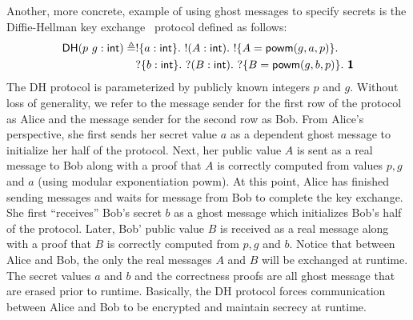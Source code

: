 Another, more concrete, example of using ghost messages to specify secrets is the
Diffie-Hellman key exchange~\cite{DH76} protocol defined as follows:
\begin{align*}
  \textsf{DH}(p\ g: \textsf{int})
  \triangleq & !\{a: \textsf{int}\}.\ !(A: \textsf{int}).\ !\{A = \textsf{powm}(g, a, p)\}.\\
             & ?\{b: \textsf{int}\}.\ ?(B: \textsf{int}).\ ?\{B = \textsf{powm}(g, b, p)\}.\ \textbf{\textsf{1}}
\end{align*}
The \textsf{DH} protocol is parameterized by publicly known integers $p$ and $g$.
Without loss of generality, we refer to the message sender for the first row of the
protocol as Alice and the message sender for the second row as Bob. From Alice's
perspective, she first sends her secret value $a$ as a dependent ghost message to
initialize her half of the protocol. Next, her public value $A$ is sent as a real
message to Bob along with a proof that $A$ is correctly computed from values $p, g$ and $a$
(using modular exponentiation \textsf{powm}). At this point, Alice has finished sending
messages and waits for message from Bob to complete the key exchange. She first
``receives'' Bob's secret $b$ as a ghost message which initializes Bob's half of the
protocol. Later, Bob' public value $B$ is received as a real message along with a proof
that $B$ is correctly computed from $p, g$ and $b$. Notice that between Alice and Bob,
the only the real messages $A$ and $B$ will be exchanged at runtime. The secret values
$a$ and $b$ and the correctness proofs are all ghost message that are erased prior to
runtime. Basically, the \textsf{DH} protocol forces communication between Alice and Bob
to be encrypted and maintain secrecy at runtime.
